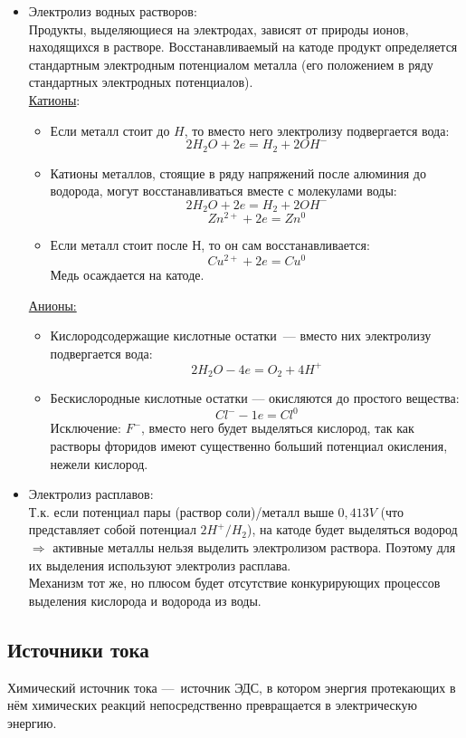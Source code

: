 \documentclass[14pt,a4paper]{scrartcl}
\begin{document}
\begin{itemize}
	\item Электролиз водных растворов: \\
	Продукты, выделяющиеся на электродах, зависят от
	природы ионов, находящихся в растворе. Восстанавливаемый на катоде продукт
	определяется стандартным электродным потенциалом металла (его положением в
	ряду стандартных электродных потенциалов). \\
	\ul{Катионы}: \\
	\begin{itemize}
		\item Если металл стоит до $H$, то вместо него электролизу подвергается вода:
		$$ 2H_2O + 2e = H_2 + 2OH^- $$
		\item Катионы металлов, стоящие в ряду напряжений после алюминия до водорода, могут восстанавливаться вместе с молекулами воды:
		$$ 2H_2O + 2e = H_2 + 2OH^- $$
		$$ Zn^{2+} + 2e = Zn^0 $$
		\item Если металл стоит после Н, то он сам восстанавливается:
		$$ Cu^{2+} + 2e = Cu^0 $$
		Медь осаждается на катоде.
	\end{itemize}
	\ul{Анионы:} \\
	\begin{itemize}
		\item Кислородсодержащие кислотные остатки — вместо них электролизу подвергается вода:
		$$ 2H_2O - 4e = O_2 + 4H^+ $$ 
		\item Бескислородные кислотные остатки — окисляются до простого вещества:
		$$ Cl^- - 1e = Cl^0 $$
		Исключение: $F^-$, вместо него будет выделяться кислород, так как растворы фторидов имеют существенно больший потенциал окисления, нежели кислород.
	\end{itemize}
	\item Электролиз расплавов:\\
	Т.к. если потенциал пары (раствор соли)/металл выше $0,413V$ (что представляет собой потенциал $2H^+/H_2 $), на катоде будет выделяться водород $\Rightarrow$ активные металлы нельзя выделить электролизом раствора. Поэтому для их выделения используют электролиз расплава. \\
	Механизм тот же, но плюсом будет отсутствие конкурирующих процессов выделения кислорода и водорода из воды.
\end{itemize}
\subsection*{Источники тока}
Химический источник тока — источник ЭДС, в котором энергия протекающих в нём
химических реакций непосредственно превращается в электрическую энергию.
\end{document}
